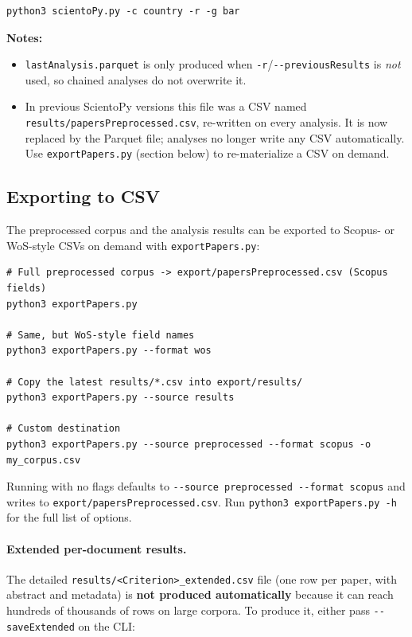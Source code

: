 \documentclass[10pt,letterpaper]{article}
\begin{document}
\begin{verbatim}
python3 scientoPy.py -c country -r -g bar
\end{verbatim}

\textbf{Notes:}
\begin{itemize}
\item \verb|lastAnalysis.parquet| is only produced when \verb|-r|/\verb|--previousResults| is \emph{not} used, so chained analyses do not overwrite it.
\item In previous ScientoPy versions this file was a CSV named \verb|results/papersPreprocessed.csv|, re-written on every analysis. It is now replaced by the Parquet file; analyses no longer write any CSV automatically. Use \verb|exportPapers.py| (section below) to re-materialize a CSV on demand.
\end{itemize}

\subsection{Exporting to CSV}

The preprocessed corpus and the analysis results can be exported to Scopus- or WoS-style CSVs on demand with \verb|exportPapers.py|:

\begin{verbatim}
# Full preprocessed corpus -> export/papersPreprocessed.csv (Scopus fields)
python3 exportPapers.py

# Same, but WoS-style field names
python3 exportPapers.py --format wos

# Copy the latest results/*.csv into export/results/
python3 exportPapers.py --source results

# Custom destination
python3 exportPapers.py --source preprocessed --format scopus -o my_corpus.csv
\end{verbatim}

Running with no flags defaults to \verb|--source preprocessed --format scopus| and writes to \verb|export/papersPreprocessed.csv|. Run \verb|python3 exportPapers.py -h| for the full list of options.

\paragraph{Extended per-document results.}
The detailed \verb|results/<Criterion>_extended.csv| file (one row per paper, with abstract and metadata) is \textbf{not produced automatically} because it can reach hundreds of thousands of rows on large corpora. To produce it, either pass \verb|--saveExtended| on the CLI:
\end{document}
